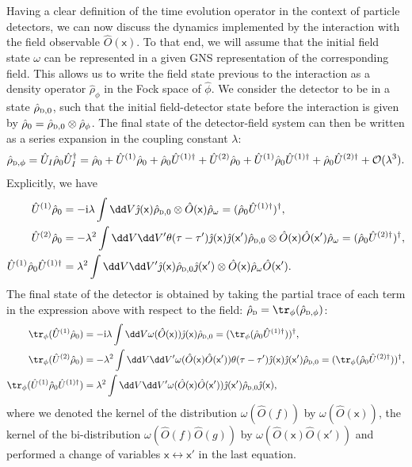 \documentclass[letterpaper,12pt,titlepage,oneside,final]{book}
\newcommand{\mf}{\mathsf}%
\newcommand{\ii}{\mathrm{i}}
\renewcommand{\r}{\hat{\rho}}
\newcommand{\tc}[1]{\textsc{#1}}
\begin{document}
Having a clear definition of the time evolution operator in the context of particle detectors, we can now discuss the dynamics implemented by the interaction with the field observable $\hat{O}(\mf x)$. To that end, we will assume that the initial field state $\omega$ can be represented in a given GNS representation of the corresponding field. This allows us to write the field state previous to the interaction as a density operator $\hat{\rho}_\phi$ in the Fock space of $\hat{\phi}$. We consider the detector to be in a state $\hat{\rho}_{\tc{d},0}$, such that the initial field-detector state before the interaction is given by $\r_0 = \r_{\tc{d},0}\otimes\r_{\phi}$. The final state of the detector-field system can then be written as a series expansion in the coupling constant $\lambda$:
\begin{equation}
    \r_{\tc{d},\phi} = \hat{U}_I \r_{0}\hat{U}_I^\dagger = \r_0 + \hat{U}^{(1)} \r_0 + \r_0 \hat{U}^{(1)\dagger} + \hat{U}^{(2)} \r_0 + \hat{U}^{(1)} \r_0 \hat{U}^{(1)\dagger} + \r_0 \hat{U}^{(2)\dagger} + \mathcal{O}(\lambda^3).
\end{equation}
Explicitly, we have
\begin{align}
    \hat{U}^{(1)} \r_0 &=  -\ii \lambda \int \dd V \hat{\jmath}(\mf x) \r_{\tc{d},0}\otimes\hat{O}(\mf x)\r_{\omega} =  (\r_0\hat{U}^{(1)\dagger})^\dagger,\\
    \hat{U}^{(2)} \r_0 &=  -\lambda^2 \int \dd V \dd V' \theta(\tau-\tau')\hat{\jmath}(\mf x)\hat{\jmath}(\mf x') \r_{\tc{d},0}\otimes\hat{O}(\mf x)\hat{O}(\mf x')\r_{\omega} = (\r_0\hat{U}^{(2)\dagger})^\dagger,\nonumber\\
    \hat{U}^{(1)} \r_0\hat{U}^{(1)\dagger} & =  \lambda^2 \int \dd V \dd V'\hat{\jmath}(\mf x) \r_{\tc{d},0}\hat{\jmath}(\mf x')\otimes\hat{O}(\mf x)\r_{\omega}\hat{O}(\mf x').\nonumber
\end{align}
The final state of the detector is obtained by taking the partial trace of each term in the expression above with respect to the field: $\hat{\rho}_{\tc{d}} = \tr_\phi(\r_{\tc{d},\phi})$:
\begin{align}
    \tr_\phi(\hat{U}^{(1)} \r_0) &=  -\ii \lambda \int \dd V \omega(\hat{O}(\mf x)) \hat{\jmath}(\mf x) \r_{\tc{d},0} =  (\tr_\phi(\r_0\hat{U}^{(1)\dagger}))^\dagger,\label{eq:dynUDW}\\
    \tr_\phi(\hat{U}^{(2)} \r_0) &=  -\lambda^2 \int \dd V \dd V'\omega(\hat{O}(\mf x)\hat{O}( \mf x'))\theta(\tau-\tau')\hat{\jmath}(\mf x)\hat{\jmath}(\mf x') \r_{\tc{d},0} = (\tr_\phi(\r_0\hat{U}^{(2)\dagger}))^\dagger,\nonumber\\
    \tr_\phi(\hat{U}^{(1)} \r_0\hat{U}^{(1)\dagger}) & =  \lambda^2 \int \dd V \dd V' \omega(\hat{O}(\mf x)\hat{O}( \mf x'))\hat{\jmath}(\mf x') \r_{\tc{d},0}\hat{\jmath}(\mf x),\nonumber
\end{align}
where we denoted the kernel of the distribution $\omega(\hat{O}(f))$ by $\omega(\hat{O}(\mf x))$, the kernel of the bi-distribution $\omega(\hat{O}(f)\hat{O}(g))$ by $\omega(\hat{O}(\mf x)\hat{O}( \mf x'))$ and performed a change of variables $\mf x \leftrightarrow \mf x'$ in the last equation.
\end{document}

